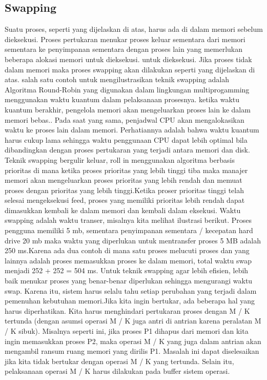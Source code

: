 \subsection {Swapping}
Suatu proses, seperti yang dijelaskan di atas, harus ada di dalam memori sebelum dieksekusi. Proses pertukaran menukar proses keluar sementara dari memori sementara ke penyimpanan sementara dengan proses lain yang memerlukan beberapa alokasi memori untuk dieksekusi.  untuk dieksekusi. Jika proses tidak dalam memori maka proses swapping akan dilakukan seperti yang dijelaskan di atas.
salah satu contoh untuk mengilustrasikan teknik swapping adalah Algoritma Round-Robin yang digunakan dalam lingkungan multiprogamming menggunakan waktu kuantum dalam pelaksanaan prosesnya. ketika waktu kuantum berakhir, pengelola memori akan mengeluarkan proses lain ke dalam memori bebas.. Pada saat yang sama, penjadwal CPU akan mengalokasikan waktu ke proses lain dalam memori. Perhatiannya adalah bahwa waktu kuantum harus cukup lama sehingga waktu penggunaan CPU dapat lebih optimal bila dibandingkan dengan proses pertukaran yang terjadi antara memori dan disk.
Teknik swapping bergulir keluar, roll in menggunakan algoritma berbasis prioritas di mana ketika proses prioritas yang lebih tinggi tiba maka manajer memori akan mengeluarkan proses prioritas yang lebih rendah dan memuat proses dengan prioritas yang lebih tinggi.Ketika proser prioritas tinggi telah selesai mengeksekusi feed, proses yang memiliki prioritas lebih rendah dapat dimasukkan kembali ke dalam memori dan kembali dalam eksekusi.
Waktu swapping adalah waktu transer, misalnya kita melihat ilustrasi berikut. Proses pengguna memiliki 5 mb, sementara penyimpanan sementara / kecepatan hard drive 20 mb maka waktu yang diperlukan untuk mentransfer proses 5 MB adalah 250 ms.Karena ada dua contoh di mana satu proses melucuti proses dan yang lainnya adalah proses memasukkan proses ke dalam memori, total waktu swap menjadi 252 + 252 = 504 ms.
Untuk teknik swapping agar lebih efisien, lebih baik menukar proses yang benar-benar diperlukan sehingga mengurangi waktu swap. Karena itu, sistem harus selalu tahu setiap perubahan yang terjadi dalam pemenuhan kebutuhan memori.Jika kita ingin bertukar, ada beberapa hal yang harus diperhatikan. Kita harus menghindari pertukaran proses dengan M / K tertunda (dengan asumsi operasi M / K juga antri di antrian karena peralatan M / K sibuk). Misalnya seperti ini, jika proses P1 dihapus dari memori dan kita ingin memasukkan proses P2, maka operasi M / K yang juga dalam antrian akan mengambil ransum ruang memori yang dirilis P1. Masalah ini dapat diselesaikan jika kita tidak bertukar dengan operasi M / K yang tertunda. Selain itu, pelaksanaan operasi M / K harus dilakukan pada buffer sistem operasi.
